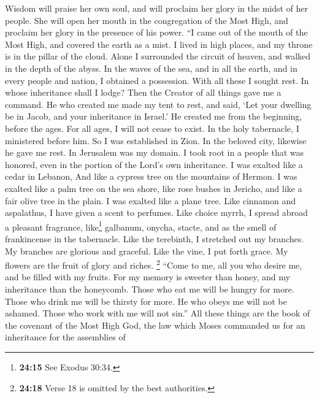  Wisdom will praise her own soul, and will proclaim her
glory in the midst of her people.  She will open her mouth
in the congregation of the Most High, and proclaim her glory in the
presence of his power.  ``I came out of the mouth of the
Most High, and covered the earth as a mist.  I lived in
high places, and my throne is in the pillar of the cloud. 
Alone I surrounded the circuit of heaven, and walked in the depth of the
abyss.  In the waves of the sea, and in all the earth, and
in every people and nation, I obtained a possession.  With
all these I sought rest. In whose inheritance shall I lodge?
 Then the Creator of all things gave me a command. He who
created me made my tent to rest, and said, `Let your dwelling be in
Jacob, and your inheritance in Israel.'  He created me
from the beginning, before the ages. For all ages, I will not cease to
exist.  In the holy tabernacle, I ministered before him.
So I was established in Zion.  In the beloved city,
likewise he gave me rest. In Jerusalem was my domain.  I
took root in a people that was honored, even in the portion of the
Lord's own inheritance.  I was exalted like a cedar in
Lebanon, And like a cypress tree on the mountains of Hermon.
 I was exalted like a palm tree on the sea shore, like
rose bushes in Jericho, and like a fair olive tree in the plain. I was
exalted like a plane tree.  Like cinnamon and aspalathus,
I have given a scent to perfumes. Like choice myrrh, I spread abroad a
pleasant fragrance, like\footnote{\textbf{24:15} See Exodus 30:34.}
galbanum, onycha, stacte, and as the smell of frankincense in the
tabernacle.  Like the terebinth, I stretched out my
branches. My branches are glorious and graceful.  Like
the vine, I put forth grace. My flowers are the fruit of glory and
riches.  \footnote{\textbf{24:18} Verse 18 is omitted by
  the best authorities.}  ``Come to me, all you who
desire me, and be filled with my fruits.  For my memory
is sweeter than honey, and my inheritance than the honeycomb.
 Those who eat me will be hungry for more. Those who
drink me will be thirsty for more.  He who obeys me will
not be ashamed. Those who work with me will not sin.'' 
All these things are the book of the covenant of the Most High God, the
law which Moses commanded us for an inheritance for the assemblies of
